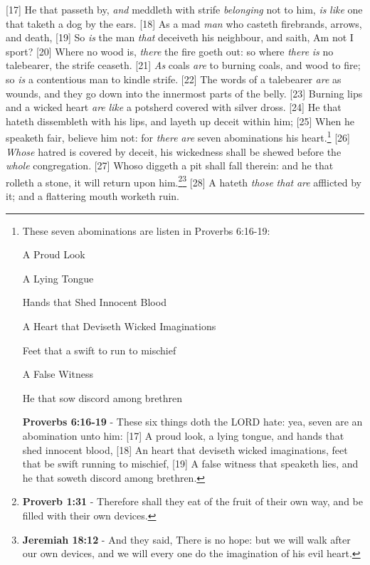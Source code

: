[17] \textcolor[cmyk]{0.99998,1,0,0}{He that passeth by, \emph{and} meddleth with strife \emph{belonging} not to him, \emph{is} \emph{like} one that taketh a dog by the ears.}
[18] \textcolor[cmyk]{0.99998,1,0,0}{As a mad \emph{man} who casteth firebrands, arrows, and death,}
[19] \textcolor[cmyk]{0.99998,1,0,0}{So \emph{is} the man \emph{that} deceiveth his neighbour, and saith, Am not I  sport?}
[20] \textcolor[cmyk]{0.99998,1,0,0}{Where no wood is, \emph{there} the fire goeth out: so where \emph{there} \emph{is} no talebearer, the strife ceaseth.}
[21] \textcolor[cmyk]{0.99998,1,0,0}{\emph{As} coals \emph{are} to burning coals, and wood to fire; so \emph{is} a contentious man to kindle strife.}
[22] \textcolor[cmyk]{0.99998,1,0,0}{The words of a talebearer \emph{are} as wounds, and they go down into the innermost parts of the belly.}
[23] \textcolor[cmyk]{0.99998,1,0,0}{Burning lips and a wicked heart \emph{are} \emph{like} a potsherd covered with silver dross.}
[24] \textcolor[cmyk]{0.99998,1,0,0}{He that hateth dissembleth with his lips, and layeth up deceit within him;}
[25] \textcolor[cmyk]{0.99998,1,0,0}{When he speaketh fair, believe him not: for \emph{there} \emph{are} seven abominations  his heart.}\footnote{These seven abominations are listen in Proverbs 6:16-19:
\begin{compactenum}
\item A Proud Look
\item A Lying Tongue
\item Hands that Shed Innocent Blood
\item A Heart that Deviseth Wicked Imaginations
\item Feet that a swift to run to mischief
\item A False Witness
\item He that sow discord among brethren
\end{compactenum}
\textbf{Proverbs 6:16-19} - These six things doth the LORD hate: yea, seven are an abomination unto him: [17] A proud look, a lying tongue, and hands that shed innocent blood, [18] An heart that deviseth wicked imaginations, feet that be swift  running to mischief, [19] A false witness that speaketh lies, and he that soweth discord among brethren.}
[26] \textcolor[cmyk]{0.99998,1,0,0}{\emph{Whose} hatred is covered by deceit, his wickedness shall be shewed before the \emph{whole} congregation.}
[27] \textcolor[cmyk]{0.99998,1,0,0}{Whoso diggeth a pit shall fall therein: and he that rolleth a stone, it will return upon him.}\footnote{\textbf{Proverb 1:31} -  Therefore shall they eat of the fruit of their own way, and be filled with their own devices.}\footnote{\textbf{Jeremiah 18:12} - And they said, There is no hope: but we will walk after our own devices, and we will every one do the imagination of his evil heart.}
[28] \textcolor[cmyk]{0.99998,1,0,0}{A  hateth \emph{those} \emph{that} \emph{are} afflicted by it; and a flattering mouth worketh ruin.}


